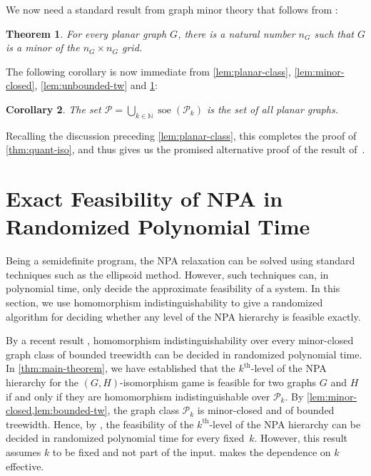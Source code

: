 \documentclass[11pt,a4paper]{article}
\theoremstyle{plain}
\newtheorem{thm}{Theorem}[section]
\newtheorem{cor}[thm]{Corollary}
\theoremstyle{remark}
\theoremstyle{definition}
\DeclareMathOperator{\soe}{soe}
\def\calP{{\mathcal P}} \def\calQ{{\mathcal Q}} \def\calR{{\mathcal R}}
\begin{document}
We now need a standard result from graph minor theory that follows from \cite{robertson-seymour-3}:

\begin{thm}\label{thm:graph-minor-theory}
    For every planar graph $G$, there is a natural number $n_G$ such that $G$ is a minor of the $n_G \times n_G$ grid. 
\end{thm}

The following corollary is now immediate from \cref{lem:planar-class}, \cref{lem:minor-closed}, \cref{lem:unbounded-tw} and \cref{thm:graph-minor-theory}:

\begin{cor}\label{cor:alt-proof}
     The set $\calP = \bigcup_{k \in \mathbb{N}}\soe(\calP_k)$ is the set of all planar graphs.  
\end{cor}

Recalling the discussion preceding \cref{lem:planar-class}, this completes the proof of \cref{thm:quant-iso}, and thus gives us the promised alternative proof of the result of~\cite{david-laura}. 


\section{Exact Feasibility of NPA in Randomized Polynomial Time}
\label{sec:alg-aspects}
Being a semidefinite program, the NPA relaxation can be solved using standard techniques such as the ellipsoid method. 
However, such techniques can, in polynomial time, only decide the approximate feasibility of a system.
In this section, we use homomorphism indistinguishability to give a randomized algorithm for deciding whether any level of the NPA hierarchy is feasible exactly.
\thmAlgorithm*

By a recent result \cite[Theorem~1.1]{seppelt_algorithmic_2024},
homomorphism indistinguishability over every minor-closed graph class of bounded treewidth can be decided in randomized polynomial time.
In \cref{thm:main-theorem}, we have established that the $k^{\text{th}}$-level of the NPA hierarchy for the $(G,H)$-isomorphism game is feasible for two graphs $G$ and $H$ if and only if 
they are homomorphism indistinguishable over $\mathcal{P}_k$.
By \cref{lem:minor-closed,lem:bounded-tw},
the graph class $\mathcal{P}_k$ is minor-closed and of bounded treewidth. 
Hence, by \cite[Theorem~1.1]{seppelt_algorithmic_2024}, 
the feasibility of the $k^{\text{th}}$-level of the NPA hierarchy can be decided in randomized polynomial time for every fixed~$k$.
However, this result assumes $k$ to be fixed and not part of the input.
 makes the dependence on $k$ effective.
\end{document}
